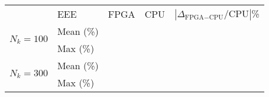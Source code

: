 \documentclass[12pt,american]{article}
\newcommand{\resultsfolder}{./results}
\newcommand{\EEEmeanfpgaIKMIkI}{}
\newcommand{\EEEmeancpuIKMIkI}{}
\newcommand{\EEEmeanrelKMIkI}{}
\newcommand{\EEEmaxfpgaIKMIkI}{}
\newcommand{\EEEmaxcpuIKMIkI}{}
\newcommand{\EEEmaxrelKMIkI}{}
\newcommand{\EEEmeanfpgaIKMIkIII}{}
\newcommand{\EEEmeancpuIKMIkIII}{}
\newcommand{\EEEmeanrelKMIkIII}{}
\newcommand{\EEEmaxfpgaIKMIkIII}{}
\newcommand{\EEEmaxcpuIKMIkIII}{}
\newcommand{\EEEmaxrelKMIkIII}{}
\begin{document}
\begin{table}[htb!]
\begin{center}
\begin{subtable}{\textwidth}
\begin{tabularx}{\textwidth}{XXXXX}
\toprule
&   EEE   & FPGA & CPU & $|\Delta_{\text{FPGA}-\text{CPU}}/\text{CPU}|$\% \\
\cmidrule{2-5}
\multirow{2}{*}{$N_k=100$} &  Mean (\%)  & \EEEmeanfpgaIKMIkI & \EEEmeancpuIKMIkI & \EEEmeanrelKMIkI\\
&Max (\%)  & \EEEmaxfpgaIKMIkI & \EEEmaxcpuIKMIkI & \EEEmaxrelKMIkI\\
\multirow{2}{*}{$N_k=300$} & Mean (\%)  & \EEEmeanfpgaIKMIkIII & \EEEmeancpuIKMIkIII & \EEEmeanrelKMIkIII\\
&Max (\%)   & \EEEmaxfpgaIKMIkIII & \EEEmaxcpuIKMIkIII & \EEEmaxrelKMIkIII\\      
\bottomrule
\end{tabularx}
\end{subtable}
\end{center}
\label{tab:preana}
\end{table}
\end{document}

